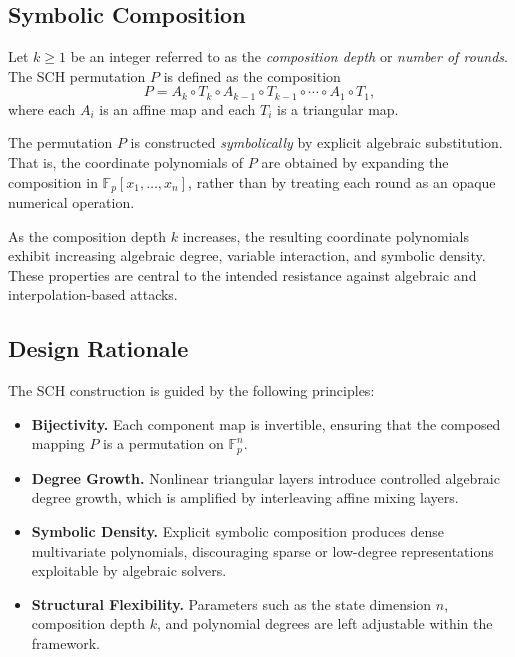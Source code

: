 ﻿\documentclass[english]{aucmcs}
\newcommand{\Fp}{\mathbb{F}_p}
\begin{document}
\subsection{Symbolic Composition}

Let $k \ge 1$ be an integer referred to as the \emph{composition depth} or
\emph{number of rounds}.
The SCH permutation $P$ is defined as the composition
\[
P
=
A_k \circ T_k \circ A_{k-1} \circ T_{k-1} \circ \cdots \circ A_1 \circ T_1,
\]
where each $A_i$ is an affine map and each $T_i$ is a triangular map.

The permutation $P$ is constructed \emph{symbolically} by explicit algebraic
substitution.
That is, the coordinate polynomials of $P$ are obtained by expanding the
composition in $\Fp[x_1,\ldots,x_n]$, rather than by treating each round as
an opaque numerical operation.

As the composition depth $k$ increases, the resulting coordinate polynomials
exhibit increasing algebraic degree, variable interaction, and symbolic density.
These properties are central to the intended resistance against algebraic and
interpolation-based attacks.

\subsection{Design Rationale}

The SCH construction is guided by the following principles:

\begin{itemize}
  \item \textbf{Bijectivity.}
  Each component map is invertible, ensuring that the composed mapping $P$
  is a permutation on $\Fp^n$.

  \item \textbf{Degree Growth.}
  Nonlinear triangular layers introduce controlled algebraic degree growth,
  which is amplified by interleaving affine mixing layers.

  \item \textbf{Symbolic Density.}
  Explicit symbolic composition produces dense multivariate polynomials,
  discouraging sparse or low-degree representations exploitable by algebraic solvers.

  \item \textbf{Structural Flexibility.}
  Parameters such as the state dimension $n$, composition depth $k$,
  and polynomial degrees are left adjustable within the framework.
\end{itemize}
\end{document}
